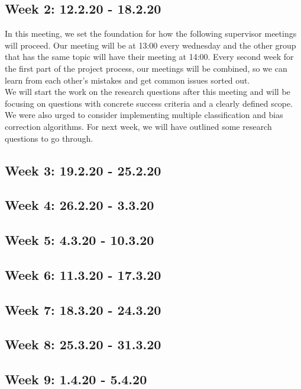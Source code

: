 \documentclass[11pt, fleqn]{article}
\begin{document}
\subsection*{Week 2: 12.2.20 - 18.2.20}
In this meeting, we set the foundation for how the following supervisor meetings will proceed. Our meeting will be at 13:00 every wednesday and the other group that has the same topic will have their meeting at 14:00. Every second week for the first part of the project process, our meetings will be combined, so we can learn from each other's mistakes and get common issues sorted out. \\
We will start the work on the research questions after this meeting and will be focusing on questions with concrete success criteria and a clearly defined scope. We were also urged to consider implementing multiple classification and bias correction algorithms. For next week, we will have outlined some research questions to go through.

\subsection*{Week 3: 19.2.20 - 25.2.20}


\subsection*{Week 4: 26.2.20 - 3.3.20}


\subsection*{Week 5: 4.3.20 - 10.3.20}


\subsection*{Week 6: 11.3.20 - 17.3.20}


\subsection*{Week 7: 18.3.20 - 24.3.20}


\subsection*{Week 8: 25.3.20 - 31.3.20}


\subsection*{Week 9: 1.4.20 - 5.4.20}
\end{document}
